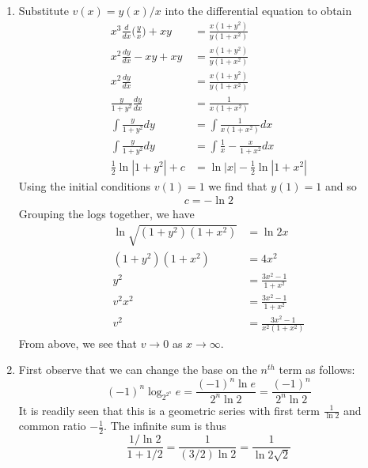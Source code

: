 \documentclass{article}
\begin{document}
\begin{enumerate}
    \item Substitute \(v(x)=y(x)/x\) into the differential equation to obtain
    \begin{align*}
        x^3\frac{d}{dx}\Big(\frac{y}{x} \Big) + xy &= \frac{x(1+y^2)}{y(1+x^2)} \\
        x^2\frac{dy}{dx}-xy + xy &= \frac{x(1+y^2)}{y(1+x^2)} \\
        x^2\frac{dy}{dx} &= \frac{x(1+y^2)}{y(1+x^2)} \\
        \frac{y}{1+y^2}\frac{dy}{dx} &= \frac{1}{x(1+x^2)} \\
        \int \frac{y}{1+y^2} dy &= \int \frac{1}{x(1+x^2)} dx \\
        \int \frac{y}{1+y^2} dy &= \int \frac{1}{x} - \frac{x}{1+x^2} dx \\
        \frac{1}{2}\ln|1+y^2| + c &= \ln|x| - \frac{1}{2}\ln|1+x^2|  
    \end{align*}
    Using the initial conditions \(v(1)=1\) we find that \(y(1)=1\) and so
    \begin{align*}
        c = -\ln2
    \end{align*}
    Grouping the logs together, we have
    \begin{align*}
        \ln{\sqrt{(1+y^2)(1+x^2)}} &= \ln{2x} \\
        (1+y^2)(1+x^2) &= 4x^2 \\
        y^2 &= \frac{3x^2-1}{1+x^2}\\
        v^2x^2 &= \frac{3x^2-1}{1+x^2} \\
        v^2 &= \frac{3x^2-1}{x^2(1+x^2)}
    \end{align*}
    From above, we see that \(v\rightarrow0\) as \(x\rightarrow \infty\).

    \item First observe that we can change the base on the \(n^{th}\) term as follows:
    \[
    (-1)^n\log_{2^{2^n}}e = \frac{(-1)^n\ln e}{2^n \ln 2} = \frac{(-1)^n}{2^n \ln 2}
    \]
    It is readily seen that this is a geometric series with first term \(\frac{1}{\ln2}\) and common ratio \(-\frac{1}{2}\). The infinite sum is thus
    \[
    \frac{1/\ln2}{1+1/2} = \frac{1}{(3/2)\ln2} = \frac{1}{\ln{2\sqrt{2}}}
    \]


\end{enumerate}
\end{document}
